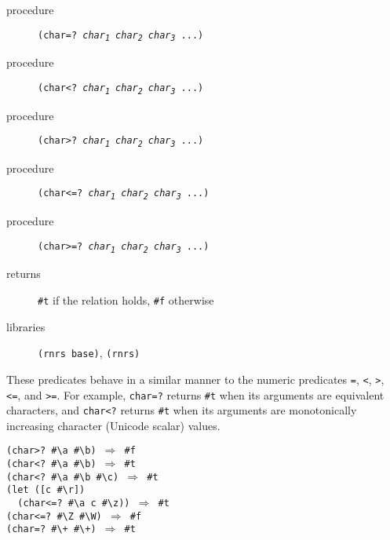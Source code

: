 \begin{description}

\label{objects_s201}\item[procedure] \texttt{(char=? \textit{char\textsubscript{1}} \textit{char\textsubscript{2}} \textit{char\textsubscript{3}} ...)}



\item[procedure] \texttt{(char\textless{}? \textit{char\textsubscript{1}} \textit{char\textsubscript{2}} \textit{char\textsubscript{3}} ...)}



\item[procedure] \texttt{(char\textgreater{}? \textit{char\textsubscript{1}} \textit{char\textsubscript{2}} \textit{char\textsubscript{3}} ...)}



\item[procedure] \texttt{(char\textless{}=? \textit{char\textsubscript{1}} \textit{char\textsubscript{2}} \textit{char\textsubscript{3}} ...)}



\item[procedure] \texttt{(char\textgreater{}=? \textit{char\textsubscript{1}} \textit{char\textsubscript{2}} \textit{char\textsubscript{3}} ...)}



\item[returns] \texttt{\#{}t} if the relation holds, \texttt{\#{}f} otherwise


\item[libraries] \texttt{(rnrs base)}, \texttt{(rnrs)}
\end{description}


These predicates behave in a similar manner to the numeric predicates
\texttt{=}, \texttt{\textless{}}, \texttt{\textgreater{}}, \texttt{\textless{}=}, and \texttt{\textgreater{}=}.
For example, \texttt{char=?} returns \texttt{\#{}t} when its arguments are
equivalent characters, and \texttt{char\textless{}?} returns \texttt{\#{}t} when its
arguments are monotonically increasing character (Unicode scalar) values.


\begin{alltt}
(char\textgreater{}? \#{}\textbackslash{}a \#{}\textbackslash{}b) \(\Rightarrow\) \#{}f
(char\textless{}? \#{}\textbackslash{}a \#{}\textbackslash{}b) \(\Rightarrow\) \#{}t
(char\textless{}? \#{}\textbackslash{}a \#{}\textbackslash{}b \#{}\textbackslash{}c) \(\Rightarrow\) \#{}t
(let ([c \#{}\textbackslash{}r])
  (char\textless{}=? \#{}\textbackslash{}a c \#{}\textbackslash{}z)) \(\Rightarrow\) \#{}t
(char\textless{}=? \#{}\textbackslash{}Z \#{}\textbackslash{}W) \(\Rightarrow\) \#{}f
(char=? \#{}\textbackslash{}+ \#{}\textbackslash{}+) \(\Rightarrow\) \#{}t
\end{alltt}

